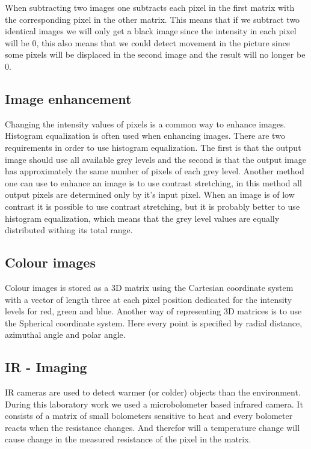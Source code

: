 When subtracting two images one subtracts each pixel in the first matrix with the corresponding pixel in the other matrix. \cite{pix-sub} %
This means that if we subtract two identical images we will only get a black image since the intensity in each pixel will be 0, this also means that we could detect movement in the picture since some pixels will be displaced in the second image and the result will no longer be 0.

\subsection{Image enhancement}
Changing the intensity values of pixels is a common way to enhance images. Histogram equalization is often used when enhancing images. There are two requirements in order to use histogram equalization. The first is that the output image should use all available grey levels and the second is that the output image has approximately the same number of pixels of each grey level. Another method one can use to enhance an image is to use contrast stretching, in this method all output pixels are determined only by it's input pixel. \cite{enhanc-img} When an image is of low contrast it is possible to use contrast stretching, but it is probably better to use histogram equalization, which means that the grey level values are equally distributed withing its total range. 

\subsection{Colour images}
Colour images is stored as a 3D matrix using the Cartesian coordinate system with a vector of length three at each pixel position dedicated for the intensity levels for red, green and blue. Another way of representing 3D matrices is to use the Spherical coordinate system. Here every point is specified by radial distance, azimuthal angle and polar angle.

\subsection{IR - Imaging}
IR cameras are used to detect warmer (or colder) objects than the environment. During this laboratory work we used a microbolometer based infrared camera. It consists of a matrix of small bolometers sensitive to heat and every bolometer reacts when the resistance changes. And therefor will a temperature change will cause change in the measured resistance of the pixel in the matrix.